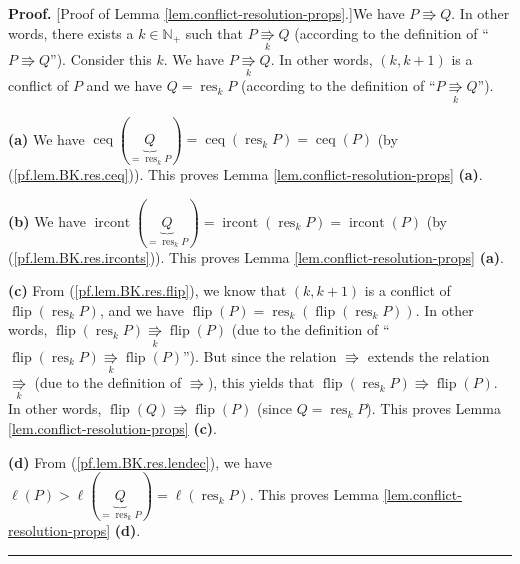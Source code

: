 \documentclass[numbers=enddot,12pt,final,onecolumn,notitlepage]{scrartcl}%
\theoremstyle{definition}
\newenvironment{proof}[1][Proof]{\noindent\textbf{#1.} }{\ \rule{0.5em}{0.5em}}
\begin{document}
\begin{proof}
[Proof of Lemma \ref{lem.conflict-resolution-props}.]We have $P\Rrightarrow
Q$. In other words, there exists a $k\in\mathbb{N}_{+}$ such that
$P\underset{k}{\Rrightarrow}Q$ (according to the definition of
\textquotedblleft$P\Rrightarrow Q$\textquotedblright). Consider this $k$. We
have $P\underset{k}{\Rrightarrow}Q$. In other words, $\left(  k,k+1\right)  $
is a conflict of $P$ and we have $Q=\operatorname*{res}\nolimits_{k}P$
(according to the definition of \textquotedblleft$P\underset{k}{\Rrightarrow
}Q$\textquotedblright).

\textbf{(a)} We have $\operatorname*{ceq}\left(  \underbrace{Q}%
_{=\operatorname*{res}\nolimits_{k}P}\right)  =\operatorname*{ceq}\left(
\operatorname*{res}\nolimits_{k}P\right)  =\operatorname*{ceq}\left(
P\right)  $ (by (\ref{pf.lem.BK.res.ceq})). This proves Lemma
\ref{lem.conflict-resolution-props} \textbf{(a)}.

\textbf{(b)} We have $\operatorname*{ircont}\left(  \underbrace{Q}%
_{=\operatorname*{res}\nolimits_{k}P}\right)  =\operatorname*{ircont}\left(
\operatorname*{res}\nolimits_{k}P\right)  =\operatorname*{ircont}\left(
P\right)  $ (by (\ref{pf.lem.BK.res.irconts})). This proves Lemma
\ref{lem.conflict-resolution-props} \textbf{(a)}.

\textbf{(c)} From (\ref{pf.lem.BK.res.flip}), we know that $\left(
k,k+1\right)  $ is a conflict of $\operatorname*{flip}\left(
\operatorname*{res}\nolimits_{k}P\right)  $, and we have $\operatorname*{flip}%
\left(  P\right)  =\operatorname*{res}\nolimits_{k}\left(
\operatorname*{flip}\left(  \operatorname*{res}\nolimits_{k}P\right)  \right)
$. In other words, $\operatorname*{flip}\left(  \operatorname*{res}%
\nolimits_{k}P\right)  \underset{k}{\Rrightarrow}\operatorname*{flip}\left(
P\right)  $ (due to the definition of \textquotedblleft$\operatorname*{flip}%
\left(  \operatorname*{res}\nolimits_{k}P\right)  \underset{k}{\Rrightarrow
}\operatorname*{flip}\left(  P\right)  $\textquotedblright). But since the
relation $\Rrightarrow$ extends the relation $\underset{k}{\Rrightarrow}$ (due
to the definition of $\Rrightarrow$), this yields that $\operatorname*{flip}%
\left(  \operatorname*{res}\nolimits_{k}P\right)  \Rrightarrow
\operatorname*{flip}\left(  P\right)  $. In other words, $\operatorname*{flip}%
\left(  Q\right)  \Rrightarrow\operatorname*{flip}\left(  P\right)  $ (since
$Q=\operatorname*{res}\nolimits_{k}P$). This proves Lemma
\ref{lem.conflict-resolution-props} \textbf{(c)}.

\textbf{(d)} From (\ref{pf.lem.BK.res.lendec}), we have $\ell\left(  P\right)
>\ell\left(  \underbrace{Q}_{=\operatorname*{res}\nolimits_{k}P}\right)
=\ell\left(  \operatorname*{res}\nolimits_{k}P\right)  $. This proves Lemma
\ref{lem.conflict-resolution-props} \textbf{(d)}.
\end{proof}
\end{document}
